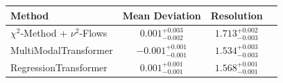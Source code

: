     \begin{tabular}{lccc}
        \toprule
        Method & Mean Deviation & Resolution \\
        \midrule
        $\chi^2$-Method + $\nu^2$-Flows & $0.001_{-0.002}^{+0.003}$ & $1.713_{-0.003}^{+0.002}$ \\
        MultiModalTransformer & $-0.001_{-0.001}^{+0.001}$ & $1.534_{-0.003}^{+0.003}$ \\
        RegressionTransformer & $0.001_{-0.001}^{+0.001}$ & $1.568_{-0.001}^{+0.001}$ \\
        \bottomrule
    \end{tabular}